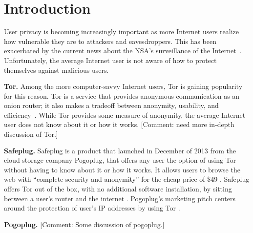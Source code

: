 \section{Introduction}
\label{sec:intro}

User privacy is becoming increasingly important as more Internet users realize how vulnerable they are to attackers and eavesdroppers.  This has been exacerbated by the current news about the NSA's surveillance of the Internet~\cite{nsa}.  Unfortunately, the average Internet user is not aware of how to protect themselves against malicious users.     

{\bf Tor.} Among the more computer-savvy Internet users, Tor is gaining popularity for this reason.  Tor is a service that provides anonymous communication as an onion router; it also makes a tradeoff between anonymity, usability, and efficiency~\cite{tor}.  While Tor provides some measure of anonymity, the average Internet user does not know about it or how it works.  [Comment: need more in-depth discussion of Tor.]

{\bf Safeplug.} Safeplug is a product that launched in December of 2013 from the cloud storage company Pogoplug, that offers any user the option of using Tor without having to know about it or how it works.  It allows users to browse the web with “complete security and anonymity” for the cheap price of \$49 \cite{safeplug}.  Safeplug offers Tor out of the box, with no additional software installation, by sitting between a user’s router and the internet \cite{wired}.  Pogoplug’s marketing pitch centers around the protection of user’s IP addresses by using Tor \cite{safeplug,bittech}.

{\bf Pogoplug.} [Comment: Some discussion of pogoplug.]
